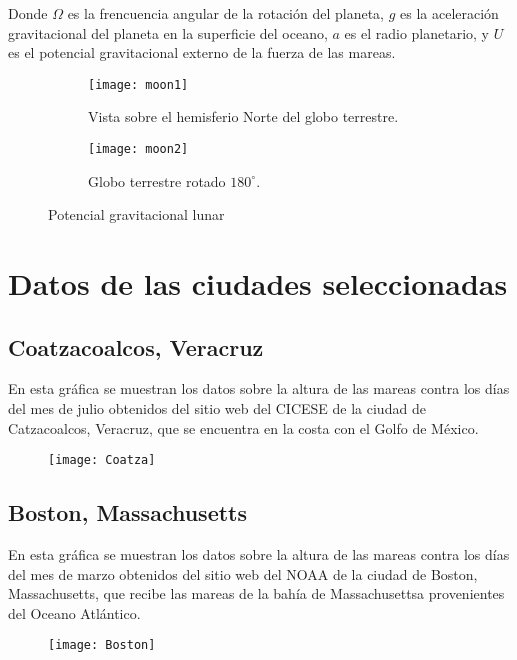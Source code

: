 \documentclass[12pt]{article}
\begin{document}
Donde $\Omega$ es la frencuencia angular de la rotación del planeta, $g$ es la aceleración gravitacional del planeta en la superficie del oceano, $a$ es el radio planetario, y $U$ es el potencial gravitacional externo de la fuerza de las mareas.


    \begin{figure}[H]
  \begin{subfigure}[b]{0.4\textwidth}
\texttt{[image: moon1]}
    \caption{Vista sobre el hemisferio Norte del globo terrestre.}
    \label{fig:f1}
  \end{subfigure}
  \hfill
  \begin{subfigure}[b]{0.4\textwidth}
    \texttt{[image: moon2]}
    \caption{Globo terrestre rotado $180^{\circ}$.}
    \label{dddd}
  \end{subfigure}
  \caption{Potencial gravitacional lunar}
\end{figure}



\section{Datos de las ciudades seleccionadas}

\subsection{Coatzacoalcos, Veracruz}

En esta gráfica se muestran los datos sobre la altura de las mareas contra los días del mes de julio obtenidos del sitio web del CICESE de la ciudad de Catzacoalcos, Veracruz, que se encuentra en la costa con el Golfo de México.

\begin{figure}[h]
\centering
\texttt{[image: Coatza]}
\end{figure}

\newpage
\subsection{Boston, Massachusetts}

En esta gráfica se muestran los datos sobre la altura de las mareas contra los días del mes de marzo obtenidos del sitio web del NOAA de la ciudad de Boston, Massachusetts, que recibe las mareas de la bahía de Massachusettsa provenientes del Oceano Atlántico.

\begin{figure}[h]
\centering
\texttt{[image: Boston]}
\end{figure}
\end{document}
